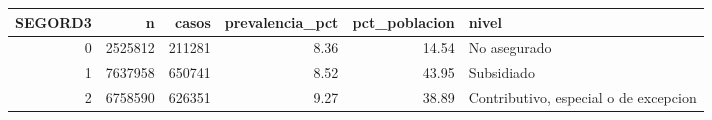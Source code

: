 \begin{tabular}{rrrrrl}
\toprule
SEGORD3 & n & casos & prevalencia\_pct & pct\_poblacion & nivel \\
\midrule
0 & 2525812 & 211281 & 8.36 & 14.54 & No asegurado \\
1 & 7637958 & 650741 & 8.52 & 43.95 & Subsidiado \\
2 & 6758590 & 626351 & 9.27 & 38.89 & Contributivo, especial o de excepcion \\
\bottomrule
\end{tabular}
